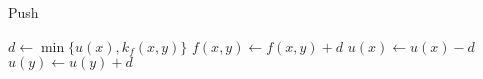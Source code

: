 \begin{algorithm}[H]
	\caption{Push}

	\Output{}
	\BlankLine

	$d \longleftarrow \min\{u(x), k_f(x,y)\}$ \newline
	$f(x,y) \longleftarrow f(x,y) + d$ \newline
	$u(x) \longleftarrow u(x) - d $ \newline
	$u(y) \longleftarrow u(y) + d$ \newline
\end{algorithm}
